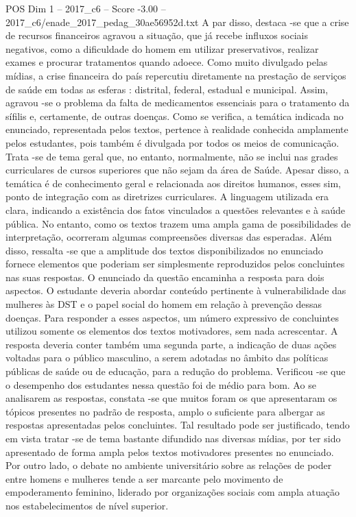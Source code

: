 \begin{textsample}{POS Dim 1 – 2017\_c6 – Score -3.00 – 2017\_c6/enade\_2017\_pedag\_30ae56952d.txt}
A par disso, destaca -se que a crise de recursos financeiros agravou a situação, que já recebe influxos sociais negativos, como a dificuldade do homem em utilizar preservativos, realizar exames e procurar tratamentos quando adoece.
Como muito divulgado pelas mídias, a crise financeira do país repercutiu diretamente na prestação de serviços de saúde em todas as esferas : distrital, federal, estadual e municipal.
Assim, agravou -se o problema da falta de medicamentos essenciais para o tratamento da sífilis e, certamente, de outras doenças.
Como se verifica, a temática indicada no enunciado, representada pelos textos, pertence à realidade conhecida amplamente pelos estudantes, pois também é divulgada por todos os meios de comunicação.
Trata -se de tema geral que, no entanto, normalmente, não se inclui nas grades curriculares de cursos superiores que não sejam da área de Saúde.
Apesar disso, a temática é de conhecimento geral e relacionada aos direitos humanos, esses sim, ponto de integração com as diretrizes curriculares.
A linguagem utilizada era clara, indicando a existência dos fatos vinculados a questões relevantes e à saúde pública.
No entanto, como os textos trazem uma ampla gama de possibilidades de interpretação, ocorreram algumas compreensões diversas das esperadas.
Além disso, ressalta -se que a amplitude dos textos disponibilizados no enunciado fornece elementos que poderiam ser simplesmente reproduzidos pelos concluintes nas suas respostas.
O enunciado da questão encaminha a resposta para dois aspectos.
O estudante deveria abordar conteúdo pertinente à vulnerabilidade das mulheres às DST e o papel social do homem em relação à prevenção dessas doenças.
Para responder a esses aspectos, um número expressivo de concluintes utilizou somente os elementos dos textos motivadores, sem nada acrescentar.
A resposta deveria conter também uma segunda parte, a indicação de duas ações voltadas para o público masculino, a serem adotadas no âmbito das políticas públicas de saúde ou de educação, para a redução do problema.
Verificou -se que o desempenho dos estudantes nessa questão foi de médio para bom.
Ao se analisarem as respostas, constata -se que muitos foram os que apresentaram os tópicos presentes no padrão de resposta, amplo o suficiente para albergar as respostas apresentadas pelos concluintes.
Tal resultado pode ser justificado, tendo em vista tratar -se de tema bastante difundido nas diversas mídias, por ter sido apresentado de forma ampla pelos textos motivadores presentes no enunciado.
Por outro lado, o debate no ambiente universitário sobre as relações de poder entre homens e mulheres tende a ser marcante pelo movimento de empoderamento feminino, liderado por organizações sociais com ampla atuação nos estabelecimentos de nível superior.

\end{textsample}
